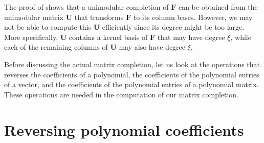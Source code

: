 The proof of  shows
that a unimodular completion of $\mathbf{F}$ can be obtained from
the unimodular matrix $\mathbf{U}$ that transforms $\mathbf{F}$
to its column bases. However, we may not be able to compute this $\mathbf{U}$
efficiently since its degree might be too large. More specifically,
$\mathbf{U}$ contains a kernel basis of $\mathbf{F}$ that may have
degree $\xi$, while each of the remaining columns of $\mathbf{U}$
may also have degree $\xi$. 

Before discussing the actual matrix completion, let us look at the
operations that reverses the coefficients of a polynomial, the coefficients
of the polynomial entries of a vector, and the coefficients of the
polynomial entries of a polynomial matrix. These operations are needed
in the computation of our matrix completion.


\section{Reversing polynomial coefficients}

